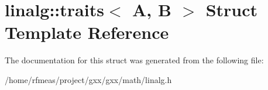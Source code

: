 \hypertarget{structlinalg_1_1traits}{}\section{linalg\+:\+:traits$<$ A, B $>$ Struct Template Reference}
\label{structlinalg_1_1traits}


The documentation for this struct was generated from the following file\+:\begin{DoxyCompactItemize}
\item 
/home/rfmeas/project/gxx/gxx/math/linalg.\+h\end{DoxyCompactItemize}
